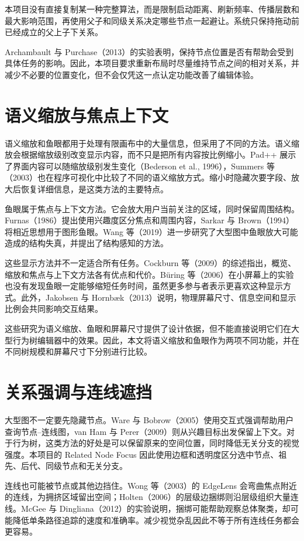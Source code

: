 \documentclass[11pt,a4paper,oneside,extrafontsizes]{memoir}
\begin{document}
本项目没有直接复制某一种完整算法，而是限制启动距离、刷新频率、传播层数和最大影响范围，再使用父子和同级关系决定哪些节点一起避让。系统只保持拖动前已经成立的父上子下关系。

Archambault 与 Purchase（2013）的实验表明，保持节点位置是否有帮助会受到具体任务的影响。因此，本项目要求重新布局时尽量维持节点之间的相对关系，并减少不必要的位置变化，但不会仅凭这一点认定功能改善了编辑体验。

\section{语义缩放与焦点上下文}

语义缩放和鱼眼都用于处理有限画布中的大量信息，但采用了不同的方法。语义缩放会根据缩放级别改变显示内容，而不只是把所有内容按比例缩小。Pad++ 展示了界面内容可以随缩放级别发生变化（Bederson et al., 1996），Summers 等（2003）也在程序可视化中比较了不同的语义缩放方式。缩小时隐藏次要字段、放大后恢复详细信息，是这类方法的主要特点。

鱼眼属于焦点与上下文方法。它会放大用户当前关注的区域，同时保留周围结构。Furnas（1986）提出使用兴趣度区分焦点和周围内容，Sarkar 与 Brown（1994）将相近思想用于图形鱼眼。Wang 等（2019）进一步研究了大型图中鱼眼放大可能造成的结构失真，并提出了结构感知的方法。

这些显示方法并不一定适合所有任务。Cockburn 等（2009）的综述指出，概览、缩放和焦点与上下文方法各有优点和代价。Büring 等（2006）在小屏幕上的实验也没有发现鱼眼一定能够缩短任务时间，虽然更多参与者表示更喜欢这种显示方式。此外，Jakobsen 与 Hornbæk（2013）说明，物理屏幕尺寸、信息空间和显示比例会共同影响交互结果。

这些研究为语义缩放、鱼眼和屏幕尺寸提供了设计依据，但不能直接说明它们在大型行为树编辑器中的效果。因此，本文将语义缩放和鱼眼作为两项不同功能，并在不同树规模和屏幕尺寸下分别进行比较。

\section{关系强调与连线遮挡}

大型图不一定要先隐藏节点。Ware 与 Bobrow（2005）使用交互式强调帮助用户查询节点–连线图，van Ham 与 Perer（2009）则从兴趣目标出发保留上下文。对于行为树，这类方法的好处是可以保留原来的空间位置，同时降低无关分支的视觉强度。本项目的 Related Node Focus 因此使用边框和透明度区分选中节点、祖先、后代、同级节点和无关分支。

连线也可能被节点或其他边挡住。Wong 等（2003）的 EdgeLens 会弯曲焦点附近的连线，为拥挤区域留出空间；Holten（2006）的层级边捆绑则沿层级组织大量连线。McGee 与 Dingliana（2012）的实验说明，捆绑可能帮助观察总体聚类，却可能降低单条路径追踪的速度和准确率。减少视觉杂乱因此不等于所有连线任务都会更容易。
\end{document}

